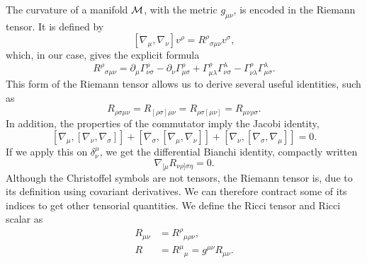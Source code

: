 The curvature of a manifold $\mathcal M$, with the metric $g_{\mu \nu}$, is encoded in the Riemann tensor.
It is defined by
%
\begin{equation}
    \label{Riemann tensor}
    [\nabla_\mu, \nabla_\nu] v^\rho = R^{\rho}{}_{\sigma \mu \nu} v^\sigma,
\end{equation}
%
which, in our case, gives the explicit formula
%
\begin{equation}
    \label{riemann tensor in terms of christoffel symbols}
    R^\rho{}_{\sigma \mu \nu} 
    = \partial_{\mu} \Gamma^{\rho}_{\nu \sigma}
    - \partial_{\nu} \Gamma^{\rho}_{\mu \sigma}
    + \Gamma^{\rho}_{\mu \lambda} \Gamma^{\lambda}_{\nu \sigma}  
    - \Gamma^{\rho}_{\nu \lambda} \Gamma^{\lambda}_{\mu \sigma}.
\end{equation}
%
This form of the Riemann tensor allows us to derive several useful identities, such as
%
\begin{equation}
    R_{\rho \sigma \mu \nu} 
    = 
    R_{[\rho \sigma] \mu \nu}
    =
    R_{\rho \sigma [\mu \nu]}
    =
    R_{\mu \nu \rho \sigma }.
\end{equation}
%
In addition, the properties of the commutator imply the Jacobi identity,
%
\begin{equation}
    \label{Jacobi identity differential geometry}
    [\nabla_\mu, [\nabla_\nu, \nabla_\sigma]]
    + [\nabla_\sigma, [\nabla_\mu, \nabla_\nu]]
    + [\nabla_\nu, [\nabla_\sigma, \nabla_\mu]] = 0.
\end{equation}
%
If we apply this on $\delta^{\mu}_{\nu}$, we get the differential Bianchi identity, compactly written
%
\begin{equation}
    \label{Binachi identiy}
    \nabla_{[\mu}R_{\nu \rho]\sigma \eta} = 0.
\end{equation}
%
Although the Christoffel symbols are not tensors, the Riemann tensor is, due to its definition using covariant derivatives.
We can therefore contract some of its indices to get other tensorial quantities.
We define the Ricci tensor and Ricci scalar as
%
\begin{align}
    \label{Ricci tensor}
    R_{\mu \nu} &= R^{\rho}{}_{\mu \rho \nu}, \\
    \label{Ricci scalar}
    R &= R^{\mu}{}_{\mu} = g^{\mu \nu} R_{\mu \nu}.
\end{align}


